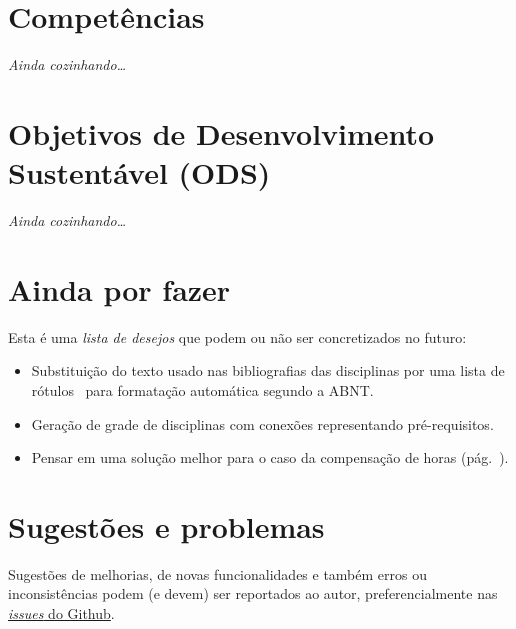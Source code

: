 \documentclass[a4paper, 11pt]{article}
\begin{document}
\section{Competências}
\textit{Ainda cozinhando\ldots}


\section{Objetivos de Desenvolvimento Sustentável (ODS)}
\textit{Ainda cozinhando\ldots}


\section{Ainda por fazer}
Esta é uma \textit{lista de desejos} que podem ou não ser concretizados no futuro:

\begin{itemize}
    \item Substituição do texto usado nas bibliografias das disciplinas por uma lista de rótulos \BibTeX\ para formatação automática segundo a ABNT.
    \item Geração de grade de disciplinas com conexões representando pré-requisitos.
    \item Pensar em uma solução melhor para o caso da compensação de horas (pág.~\pageref{sec:compensacao-carga-horaria}).
\end{itemize}


\section{Sugestões e problemas}
Sugestões de melhorias, de novas funcionalidades e também erros ou inconsistências podem (e devem) ser reportados ao autor, preferencialmente nas \href{https://github.com/jandermoreira/ppc-ufscar/issues}{\textit{issues} do Github}.

\printindex
\end{document}
